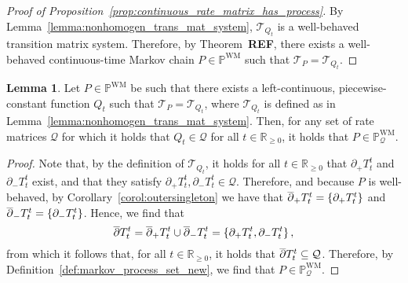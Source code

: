 \documentclass[10pt]{paper}
\theoremstyle{definition}
\newtheorem{lemma}[theorem]{Lemma}
\newcommand{\reals}{\mathbb{R}}
\newcommand{\realsnonneg}{\reals_{\geq 0}}
\newcommand{\processes}{\mathbb{P}}
\newcommand{\wmprocesses}{\processes^{\mathrm{WM}}}
\newcommand{\rateset}{\mathcal{Q}}
\begin{document}
\begin{proof}[Proof of Proposition~\ref{prop:continuous_rate_matrix_has_process}]
By Lemma~\ref{lemma:nonhomogen_trans_mat_system}, $\mathcal{T}_{Q_t}$ is a well-behaved transition matrix system. Therefore, by Theorem~{\bf REF}, there exists a well-behaved continuous-time Markov chain $P\in\wmprocesses$ such that $\mathcal{T}_P=\mathcal{T}_{Q_t}$.
\end{proof}

\begin{lemma}\label{lemma:nonhomogeneous_in_process_set}
Let $P\in\wmprocesses$ be such that there exists a left-continuous, piecewise-constant function $Q_t$ such that $\mathcal{T}_P=\mathcal{T}_{Q_t}$, where $\mathcal{T}_{Q_t}$ is defined as in Lemma~\ref{lemma:nonhomogen_trans_mat_system}. Then, for any set of rate matrices $\rateset$ for which it holds that $Q_t\in\rateset$ for all $t\in\realsnonneg$, it holds that $P\in\wmprocesses_\rateset$.
\end{lemma}
\begin{proof}
Note that, by the definition of $\mathcal{T}_{Q_t}$, it holds for all $t\in\realsnonneg$ that $\partial_+T_t^t$ and $\partial_-T_t^t$ exist, and that they satisfy $\partial_+T_t^t,\partial_-T_t^t\in\rateset$. Therefore, and because $P$ is well-behaved, by Corollary~\ref{corol:outersingleton} we have that $\smash{\overline{\partial}}_+T_t^t=\{\partial_+T_t^t\}$ and $\smash{\overline{\partial}}_-T_t^t=\{\partial_-T_t^t\}$. Hence, we find that
\begin{equation*}
\smash{\overline{\partial}}T_t^t = \smash{\overline{\partial}}_+T_t^t\cup \smash{\overline{\partial}}_-T_t^t = \{\partial_+T_t^t, \partial_-T_t^t\}\,,
\end{equation*}
from which it follows that, for all $t\in\realsnonneg$, it holds that $\smash{\overline{\partial}}T_t^t\subseteq\rateset$. Therefore, by Definition~\ref{def:markov_process_set_new}, we find that $P\in\wmprocesses_\rateset$.
\end{proof}
\end{document}
